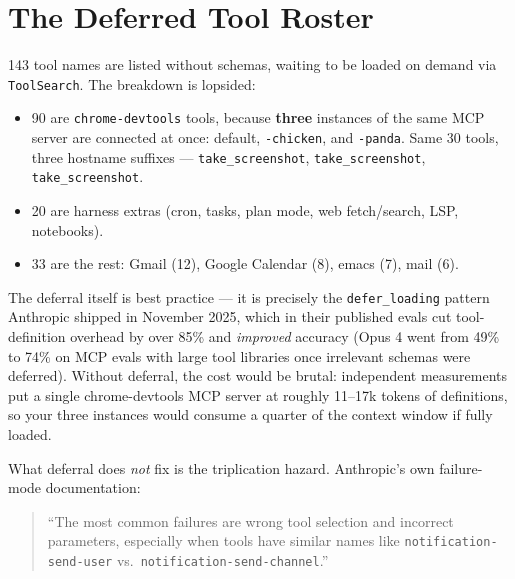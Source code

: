 \documentclass[11pt,letterpaper]{article}
\newenvironment{excerpt}{%
  \par\vspace{0.5em}%
  \begin{quote}\small\color{acdark}%
}{%
  \end{quote}\vspace{0.3em}\par%
}
\begin{document}
\section{The Deferred Tool Roster}

143 tool names are listed without schemas, waiting to be loaded on demand via \texttt{ToolSearch}. The breakdown is lopsided:

\begin{itemize}[leftmargin=1.4em, itemsep=0.1em]
\item 90 are \texttt{chrome-devtools} tools, because \textbf{three} instances of the same MCP server are connected at once: default, \texttt{-chicken}, and \texttt{-panda}. Same 30 tools, three hostname suffixes --- \texttt{take\_screenshot}, \texttt{take\_screenshot}, \texttt{take\_screenshot}.
\item 20 are harness extras (cron, tasks, plan mode, web fetch/search, LSP, notebooks).
\item 33 are the rest: Gmail (12), Google Calendar (8), emacs (7), mail (6).
\end{itemize}

The deferral itself is best practice --- it is precisely the \texttt{defer\_loading} pattern Anthropic shipped in November 2025, which in their published evals cut tool-definition overhead by over 85\% and \textit{improved} accuracy (Opus 4 went from 49\% to 74\% on MCP evals with large tool libraries once irrelevant schemas were deferred). Without deferral, the cost would be brutal: independent measurements put a single chrome-devtools MCP server at roughly 11--17k tokens of definitions, so your three instances would consume a quarter of the context window if fully loaded.

What deferral does \textit{not} fix is the triplication hazard. Anthropic's own failure-mode documentation:

\begin{excerpt}
``The most common failures are wrong tool selection and incorrect parameters, especially when tools have similar names like \texttt{notification-send-user} vs.\ \texttt{notification-send-channel}.''
\end{excerpt}
\end{document}
